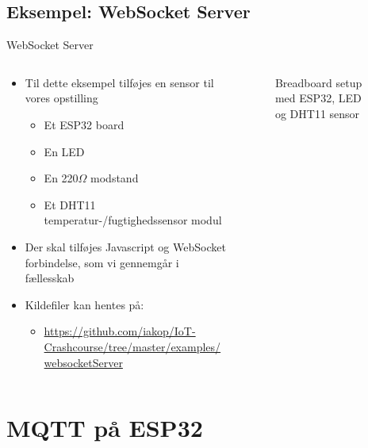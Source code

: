 \documentclass[aspectratio=169]{beamer}
\begin{document}
\subsection{Eksempel: WebSocket Server}
\begin{frame}{WebSocket Server}
\begin{columns}
	\begin{column}{0.6\textwidth}
		\begin{textBox}
		\begin{itemize}
			\item Til dette eksempel tilføjes en sensor til vores opstilling
			\begin{itemize}
				\item Et ESP32 board
				\item En LED
				\item En 220{\textsf{$\Omega$}} modstand
				\item Et DHT11 temperatur-/fugtighedssensor modul
			\end{itemize}
			\item Der skal tilføjes Javascript og WebSocket forbindelse, som vi gennemgår i fællesskab
			\item Kildefiler kan hentes på:
			\begin{itemize}
				\item \tiny\url{https://github.com/iakop/IoT-Crashcourse/tree/master/examples/websocketServer}
			\end{itemize}
		\end{itemize}
		\end{textBox}
	\end{column}
	\begin{column}{0.4\textwidth}
		\centering
		\begin{figure}
  			
  			\caption{Breadboard setup med ESP32, LED og DHT11 sensor}
  			\label{fig:esp32-led-dht11}
		\end{figure}
	\end{column}
\end{columns}
\end{frame}

\section{MQTT på ESP32}
\begin{frame}
\end{frame}
\end{document}
